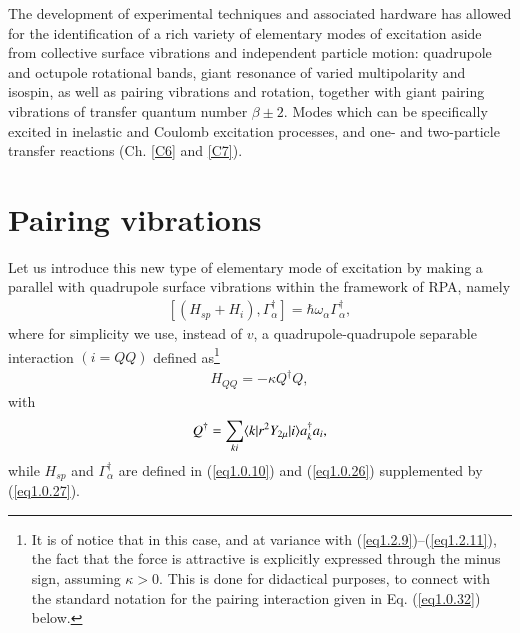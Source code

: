 The development of experimental techniques and associated hardware has allowed for the identification of a rich variety of elementary modes of excitation aside from collective surface vibrations  and independent particle motion: quadrupole and octupole rotational bands, giant resonance of varied multipolarity and isospin, as well as pairing vibrations and rotation, together with giant pairing vibrations of transfer quantum number $\beta\pm 2$. Modes which can be specifically excited in inelastic and Coulomb excitation processes, and one- and two-particle transfer reactions (Ch. \ref{C6} and \ref{C7}).
\section{Pairing vibrations}\label{Sect1.3}
Let us introduce this new type of elementary mode of excitation by making a parallel with quadrupole surface vibrations within the framework of RPA, namely
\begin{align}\label{eq1.0.29}
\left[(H_{sp}+H_i),\Gamma_{\alpha}^\dagger\right]=\hbar\omega_\alpha\Gamma_{\alpha}^\dagger,
\end{align}
where for simplicity we use, instead of $v$, a quadrupole-quadrupole separable interaction $(i=QQ)$ defined as\footnote{It is of notice that in this case, and at variance with (\ref{eq1.2.9})--(\ref{eq1.2.11}), the fact that the force is attractive is explicitly expressed through the minus sign, assuming $\kappa>0$. This is done for didactical purposes, to connect with the standard notation for the pairing interaction given in Eq. (\ref{eq1.0.32}) below.}
\begin{align}\label{eq1.0.30}
H_{QQ}=-\kappa Q^\dagger Q,
\end{align}
with 
\begin{align}\label{eq1.0.31}
 Q^\dagger=\sum_{ki}\langle {k|r^2 Y_{2\mu}|i} \rangle a^\dagger_k a_i,
\end{align}
while $H_{sp}$ and $\Gamma^\dagger_\alpha$ are defined in (\ref{eq1.0.10}) and (\ref{eq1.0.26}) supplemented by (\ref{eq1.0.27}).

